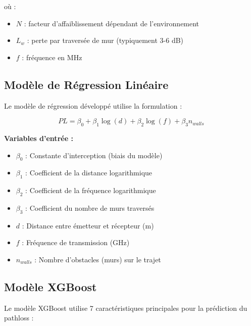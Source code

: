 \documentclass[12pt,a4paper]{article}
\begin{document}
où :
\begin{itemize}
    \item $N$ : facteur d'affaiblissement dépendant de l'environnement
    \item $L_w$ : perte par traversée de mur (typiquement 3-6 dB)
    \item $f$ : fréquence en MHz
\end{itemize}

\subsection{Modèle de Régression Linéaire}

Le modèle de régression développé utilise la formulation :

\begin{equation}
\boxed{PL = \beta_0 + \beta_1 \log(d) + \beta_2 \log(f) + \beta_3 n_{walls}}
\end{equation}

\textbf{Variables d'entrée :}
\begin{itemize}
    \item $\beta_0$ : Constante d'interception (biais du modèle)
    \item $\beta_1$ : Coefficient de la distance logarithmique  
    \item $\beta_2$ : Coefficient de la fréquence logarithmique
    \item $\beta_3$ : Coefficient du nombre de murs traversés
    \item $d$ : Distance entre émetteur et récepteur (m)
    \item $f$ : Fréquence de transmission (GHz)
    \item $n_{walls}$ : Nombre d'obstacles (murs) sur le trajet
\end{itemize}

\subsection{Modèle XGBoost}

Le modèle XGBoost utilise 7 caractéristiques principales pour la prédiction du pathloss :
\end{document}
